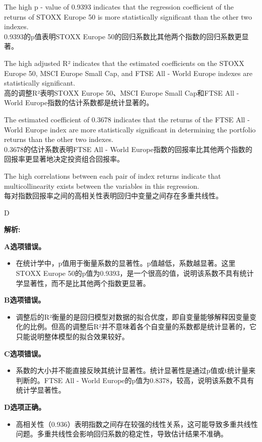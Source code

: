 \documentclass{article}
\newenvironment{explanation}
{\textbf{解析:}\par}
{\par}
\begin{document}
    \begin{choices}
        \item The high p - value of 0.9393 indicates that the regression coefficient of the returns of STOXX Europe 50 is more statistically significant than the other two indexes.\\
        0.9393的p值表明STOXX Europe 50的回归系数比其他两个指数的回归系数更显著。
        \item The high adjusted R² indicates that the estimated coefficients on the STOXX Europe 50, MSCI Europe Small Cap, and FTSE All - World Europe indexes are statistically significant.\\
        高的调整R²表明STOXX Europe 50、MSCI Europe Small Cap和FTSE All - World Europe指数的估计系数都是统计显著的。
        \item The estimated coefficient of 0.3678 indicates that the returns of the FTSE All - World Europe index are more statistically significant in determining the portfolio returns than the other two indexes.\\
        0.3678的估计系数表明FTSE All - World Europe指数的回报率比其他两个指数的回报率更显著地决定投资组合回报率。
        \item The high correlations between each pair of index returns indicate that multicollinearity exists between the variables in this regression.\\
        每对指数回报率之间的高相关性表明回归中变量之间存在多重共线性。
    \end{choices}
    
    \begin{correctanswer}
        D
    \end{correctanswer}
    
    \begin{explanation}
    \textbf{A选项错误。}
    \begin{itemize}
        \item 在统计学中，p值用于衡量系数的显著性。p值越低，系数越显著。这里STOXX Europe 50的p值为0.9393，是一个很高的值，说明该系数不具有统计学显著性，而不是比其他两个指数更显著。
    \end{itemize}
    \textbf{B选项错误。}
    \begin{itemize}
        \item 调整后的R²衡量的是回归模型对数据的拟合优度，即自变量能够解释因变量变化的比例。但高的调整后R²并不意味着各个自变量的系数都是统计显著的，它只能说明整体模型的拟合效果较好。
    \end{itemize}
    \textbf{C选项错误。}
    \begin{itemize}
        \item 系数的大小并不能直接反映其统计显著性。统计显著性是通过p值或t统计量来判断的。FTSE All - World Europe的p值为0.8378，较高，说明该系数不具有统计学显著性。
    \end{itemize}
    \textbf{D选项正确。}
    \begin{itemize}
        \item 高相关性（0.936）表明指数之间存在较强的线性关系，这可能导致多重共线性问题。多重共线性会影响回归系数的稳定性，导致估计结果不准确。
    \end{itemize}
    \end{explanation}
    
\end{document}
